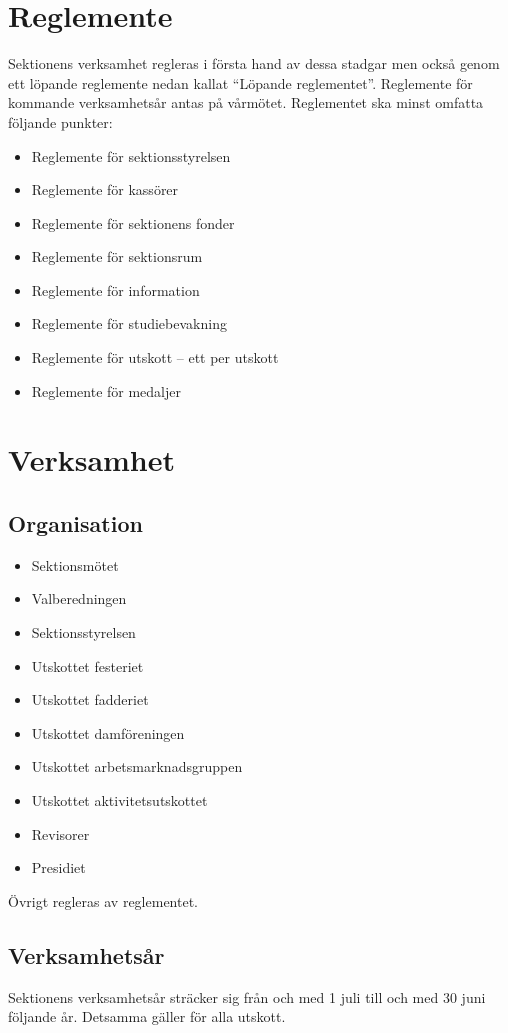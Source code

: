 \documentclass{datateknologsektionen-document}
\begin{document}
  \section{Reglemente}
    Sektionens verksamhet regleras i första hand av dessa stadgar men också genom ett
    löpande reglemente nedan kallat ``Löpande reglementet''. Reglemente för kommande
    verksamhetsår antas på vårmötet. Reglementet ska minst omfatta följande punkter:
    \begin{itemize}
      \item Reglemente för sektionsstyrelsen
      \item Reglemente för kassörer
      \item Reglemente för sektionens fonder
      \item Reglemente för sektionsrum
      \item Reglemente för information
      \item Reglemente för studiebevakning
      \item Reglemente för utskott – ett per utskott
      \item Reglemente för medaljer
    \end{itemize}
     
  \section{Verksamhet}
    \subsection{Organisation}
      \begin{itemize}
        \item Sektionsmötet
        \item Valberedningen
        \item Sektionsstyrelsen
        \item Utskottet festeriet
        \item Utskottet fadderiet
        \item Utskottet damföreningen
	\item Utskottet arbetsmarknadsgruppen
	\item Utskottet aktivitetsutskottet
        \item Revisorer
        \item Presidiet
      \end{itemize}
      Övrigt regleras av reglementet.

    \subsection{Verksamhetsår}
      Sektionens verksamhetsår sträcker sig från och med 1 juli till och med 30 juni följande
      år. Detsamma gäller för alla utskott.
\end{document}
